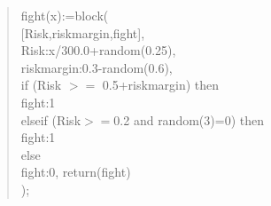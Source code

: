 \documentclass[]{article}
\begin{document}
	\begin{quote}
		
fight(x):=block(\\
\hspace*{10mm}[Risk,riskmargin,fight],\\
\hspace*{10mm}Risk:x/300.0+random(0.25),\\
\hspace*{10mm}riskmargin:0.3-random(0.6),\\
\hspace*{10mm}if (Risk $>=$ 0.5+riskmargin) then\\
\hspace*{20mm}fight:1\\
\hspace*{15mm}elseif (Risk$>=$0.2 and random(3)=0) then\\
\hspace*{20mm}fight:1\\
\hspace*{15mm}else\\
\hspace*{20mm}fight:0, return(fight)\\
\hspace*{10mm});\\		
		

\end{quote}
\end{document}
